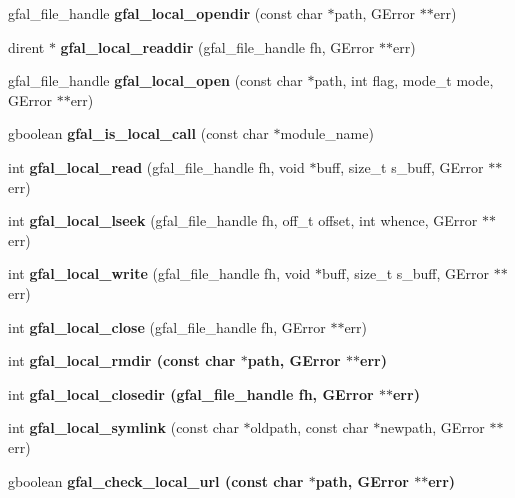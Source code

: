 \begin{CompactItemize}
\item 
gfal\_\-file\_\-handle \textbf{gfal\_\-local\_\-opendir} (const char $\ast$path, GError $\ast$$\ast$err)\label{gfal__posix__local__file_8c_56dc809549c9ff1f7f245619fae1dea5}

\item 
dirent $\ast$ \textbf{gfal\_\-local\_\-readdir} (gfal\_\-file\_\-handle fh, GError $\ast$$\ast$err)\label{gfal__posix__local__file_8c_62b4c61d92b03111251803bc1f0a56b5}

\item 
gfal\_\-file\_\-handle \textbf{gfal\_\-local\_\-open} (const char $\ast$path, int flag, mode\_\-t mode, GError $\ast$$\ast$err)\label{gfal__posix__local__file_8c_b596322ecc96fdc80c6c21802483f1d4}

\item 
gboolean \textbf{gfal\_\-is\_\-local\_\-call} (const char $\ast$module\_\-name)\label{gfal__posix__local__file_8c_41bf6452e794fbfd86b1cfd95fe61f5b}

\item 
int \textbf{gfal\_\-local\_\-read} (gfal\_\-file\_\-handle fh, void $\ast$buff, size\_\-t s\_\-buff, GError $\ast$$\ast$err)\label{gfal__posix__local__file_8c_45d46420d93abbaa7bbeb345bd8a6584}

\item 
int \textbf{gfal\_\-local\_\-lseek} (gfal\_\-file\_\-handle fh, off\_\-t offset, int whence, GError $\ast$$\ast$err)\label{gfal__posix__local__file_8c_3e1930273b0fa1021de561b1f1598f4a}

\item 
int \textbf{gfal\_\-local\_\-write} (gfal\_\-file\_\-handle fh, void $\ast$buff, size\_\-t s\_\-buff, GError $\ast$$\ast$err)\label{gfal__posix__local__file_8c_b9335b2236704108f4492032685d5ba2}

\item 
int \textbf{gfal\_\-local\_\-close} (gfal\_\-file\_\-handle fh, GError $\ast$$\ast$err)\label{gfal__posix__local__file_8c_145bf9e9edbe0321103e13a665c08d8a}

\item 
int \bf{gfal\_\-local\_\-rmdir} (const char $\ast$path, GError $\ast$$\ast$err)
\item 
int \bf{gfal\_\-local\_\-closedir} (gfal\_\-file\_\-handle fh, GError $\ast$$\ast$err)
\item 
int \textbf{gfal\_\-local\_\-symlink} (const char $\ast$oldpath, const char $\ast$newpath, GError $\ast$$\ast$err)\label{gfal__posix__local__file_8c_dbae707b88f01b0a663165bbe43d314c}

\item 
gboolean \bf{gfal\_\-check\_\-local\_\-url} (const char $\ast$path, GError $\ast$$\ast$err)
\end{CompactItemize}


